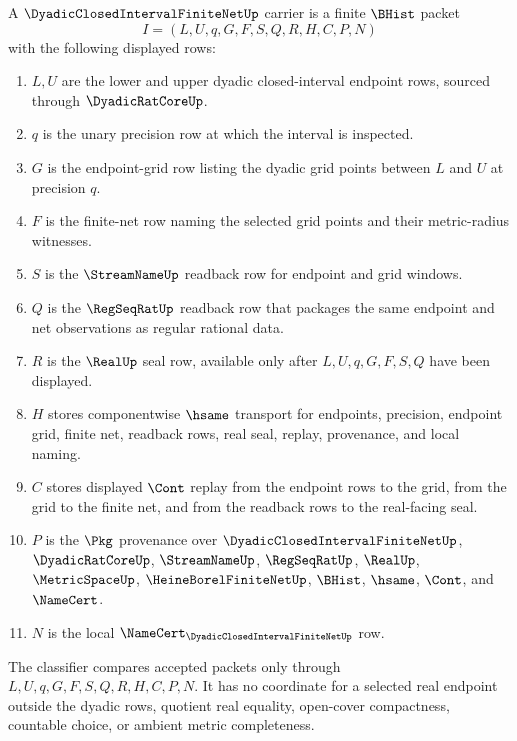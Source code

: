 \begin{definition}
\label{def:dyadic-closed-interval-finite-net-carrier}
A $\DyadicClosedIntervalFiniteNetUp$ carrier is a finite $\BHist$ packet
$$
I=(L,U,q,G,F,S,Q,R,H,C,P,N)
$$
with the following displayed rows:
\begin{enumerate}
\item $L,U$ are the lower and upper dyadic closed-interval endpoint rows, sourced through $\DyadicRatCoreUp$.
\item $q$ is the unary precision row at which the interval is inspected.
\item $G$ is the endpoint-grid row listing the dyadic grid points between $L$ and $U$ at precision $q$.
\item $F$ is the finite-net row naming the selected grid points and their metric-radius witnesses.
\item $S$ is the $\StreamNameUp$ readback row for endpoint and grid windows.
\item $Q$ is the $\RegSeqRatUp$ readback row that packages the same endpoint and net observations as regular rational data.
\item $R$ is the $\RealUp$ seal row, available only after $L,U,q,G,F,S,Q$ have been displayed.
\item $H$ stores componentwise $\hsame$ transport for endpoints, precision, endpoint grid, finite net, readback rows, real seal, replay, provenance, and local naming.
\item $C$ stores displayed $\Cont$ replay from the endpoint rows to the grid, from the grid to the finite net, and from the readback rows to the real-facing seal.
\item $P$ is the $\Pkg$ provenance over $\DyadicClosedIntervalFiniteNetUp$, $\DyadicRatCoreUp$, $\StreamNameUp$, $\RegSeqRatUp$, $\RealUp$, $\MetricSpaceUp$, $\HeineBorelFiniteNetUp$, $\BHist$, $\hsame$, $\Cont$, and $\NameCert$.
\item $N$ is the local $\NameCert_{\DyadicClosedIntervalFiniteNetUp}$ row.
\end{enumerate}
The classifier compares accepted packets only through $L,U,q,G,F,S,Q,R,H,C,P,N$. It has no coordinate for a selected real endpoint outside the dyadic rows, quotient real equality, open-cover compactness, countable choice, or ambient metric completeness.
\end{definition}

